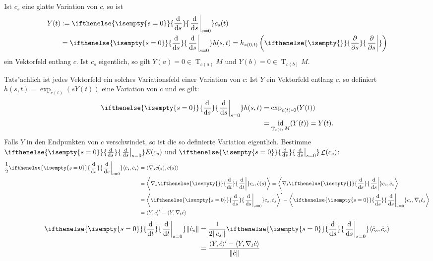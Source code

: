 \documentclass[paper=A4, twoside, chapterprefix=true, bibliography=totoc, headsepline]{scrbook}
\DeclareMathOperator{\calL}{\mathcal{L}}
\DeclareMathOperator{\id}{id}       %
\DeclareMathOperator{\T}{T}         %
\newcommand{\dop}{\mathrm{d}}
\newcommand{\difffrac}[3][]{\ifthenelse{\isempty{#1}}{\frac{\dop #2}{\dop #3}}{\left. \frac{\dop #2}{\dop #3} \right|_{#1}}}
\newcommand{\pdifffrac}[3][]{\ifthenelse{\isempty{#1}}{\frac{\partial #2}{\partial #3}}{\left. \frac{\partial #2}{\partial #3} \right|_{#1}}}
\theoremstyle{plain}
\theoremstyle{nonumberplain}
\theoremstyle{empty}
\theoremstyle{break}
\begin{document}
Ist $c_s$ eine glatte Variation von $c$, so ist
\begin{align*}
  Y(t) &:= \difffrac[s=0]{}{s} c_s(t)\\
  &= \difffrac[s=0]{}{s} h(s,t) =
  h_{*(0,t)}\left(\pdifffrac{}{s}\right)
\end{align*}
ein Vektorfeld entlang $c$. Ist $c_s$ eigentlich, so gilt $Y(a) = 0
\in \T_{c(a)}M$ und $Y(b) = 0 \in \T_{c(b)}M$.
\begin{center}\end{center}
Tats"achlich ist jedes Vektorfeld ein solches Variationsfeld einer Variation von $c$: Ist $Y$ ein Vektorfeld entlang $c$, so definiert $h(s,t) = \exp_{c(t)}(s Y(t))$ eine Variation von $c$ und es gilt:
\begin{align*}
  \difffrac[s=0]{}{s} h(s,t) &= \exp_{c(t)*0}(Y(t))\\
  &= \id_{\T_{c(t)}M}(Y(t)) = Y(t).
\end{align*}
Falls $Y$ in den Endpunkten von $c$ verschwindet, so ist die so definierte Variation eigentlich.
Bestimme $\difffrac[s=0]{}{s} E(c_s)$ und $\difffrac[s=0]{}{s}\calL(c_s)$:
\begin{align*}
  \frac{1}{2} \difffrac[s=0]{}{s} \langle \dot c_s, \dot c_s \rangle &= \langle \nabla_s \dot c(s), \dot c(s) \rangle\\
  &= \left\langle \nabla_s \difffrac{}{t} c_s, \dot c(s) \right\rangle = \left\langle \nabla_t \difffrac{}{s} c_s, \dot c_s \right\rangle \\
  &= \left\langle \difffrac[s=0]{}{s} c_s, \dot c_s \right\rangle' - \left\langle \difffrac[s=0]{}{s} c_s, \nabla_t \dot c_s \right\rangle \\
  &= \left\langle Y, \dot c \right\rangle' - \left\langle Y, \nabla_t \dot c \right\rangle\\
\end{align*}
\begin{align*}
  \difffrac[s=0]{}{t} \|\dot c_s\| &= \frac{1}{2 \|c_s\|} \difffrac[s=0]{}{s} \langle \dot c_s, \dot c_s \rangle\\
  &= \frac{\langle Y, \dot c \rangle' - \langle Y, \nabla_t \dot c
    \rangle}{\|\dot c\|}
\end{align*}
\end{document}
